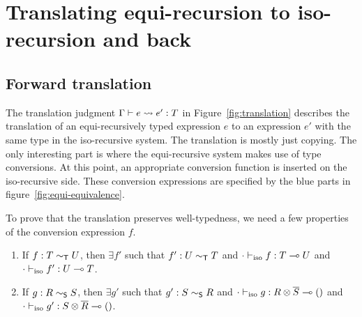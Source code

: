 \section{Translating equi-recursion to iso-recursion and back}

\subsection{Forward translation}
\label{sec:forward}




The translation judgment $\translation e {e'} T$ in
Figure~\ref{fig:translation} describes the translation of an equi-recursively
typed expression $e$ to an expression $e'$ with the same type in the iso-recursive
system. The translation is mostly just copying. The only interesting part is where the
equi-recursive system makes use of type conversions. At this point, an appropriate
conversion function is inserted on the iso-recursive side. These
conversion expressions are specified by the blue parts in figure~\ref{fig:equi-equivalence}.
\begin{mathpar}
\end{mathpar}

To prove that the translation preserves well-typedness, we
need a few properties of the conversion expression $f$.
\begin{lemma}
  \begin{enumerate}
  \item If $f : T \eqt U$, then $\exists f'$ such that  $f' : U \eqt
    T$ and $\typing[\CNil]{\tyIso f}{\TFun TU}$ and $\typing[\CNil]{\tyIso f'}{\TFun UT}$.
  \item If $g : R \eqs S$, then $\exists g'$ such that  $g' : S \eqs
    R$ and $\typing[\CNil]{\tyIso g}{\TFun{\TPair
      R {\TDual S}} \TUnit}$ and $\typing[\CNil]{\tyIso g'}{\TFun{\TPair
      S {\TDual R}} \TUnit}$.
  \end{enumerate}
\end{lemma}

